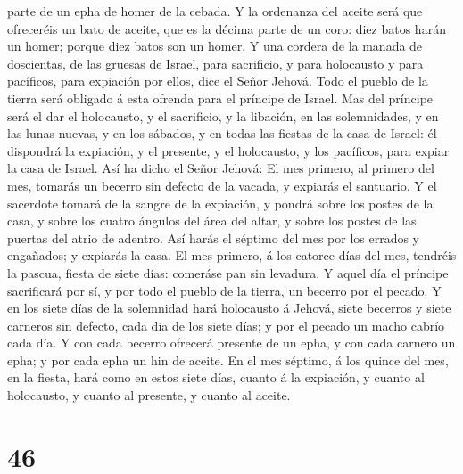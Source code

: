 parte de un epha de homer de la cebada.  Y la ordenanza del
aceite será que ofreceréis un bato de aceite, que es la décima parte de
un coro: diez batos harán un homer; porque diez batos son un homer.
 Y una cordera de la manada de doscientas, de las gruesas
de Israel, para sacrificio, y para holocausto y para pacíficos, para
expiación por ellos, dice el Señor Jehová.  Todo el pueblo
de la tierra será obligado á esta ofrenda para el príncipe de Israel.
 Mas del príncipe será el dar el holocausto, y el
sacrificio, y la libación, en las solemnidades, y en las lunas nuevas, y
en los sábados, y en todas las fiestas de la casa de Israel: él
dispondrá la expiación, y el presente, y el holocausto, y los pacíficos,
para expiar la casa de Israel.  Así ha dicho el Señor
Jehová: El mes primero, al primero del mes, tomarás un becerro sin
defecto de la vacada, y expiarás el santuario.  Y el
sacerdote tomará de la sangre de la expiación, y pondrá sobre los postes
de la casa, y sobre los cuatro ángulos del área del altar, y sobre los
postes de las puertas del atrio de adentro.  Así harás el
séptimo del mes por los errados y engañados; y expiarás la casa.
 El mes primero, á los catorce días del mes, tendréis la
pascua, fiesta de siete días: comeráse pan sin levadura.  Y
aquel día el príncipe sacrificará por sí, y por todo el pueblo de la
tierra, un becerro por el pecado.  Y en los siete días de
la solemnidad hará holocausto á Jehová, siete becerros y siete carneros
sin defecto, cada día de los siete días; y por el pecado un macho cabrío
cada día.  Y con cada becerro ofrecerá presente de un epha,
y con cada carnero un epha; y por cada epha un hin de aceite.
 En el mes séptimo, á los quince del mes, en la fiesta,
hará como en estos siete días, cuanto á la expiación, y cuanto al
holocausto, y cuanto al presente, y cuanto al aceite.

\hypertarget{section-45}{%
\section{46}\label{section-45}}

